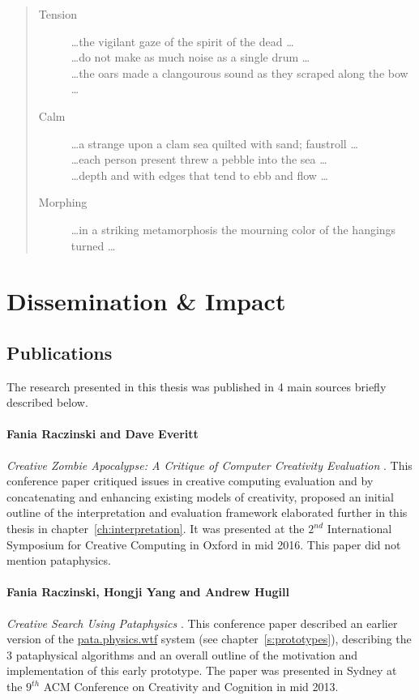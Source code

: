 \begin{quotation}
\begin{description}
  \item [Tension] \ldots the vigilant gaze of the spirit of the dead \ldots \\ \ldots do not make as much noise as a single drum \ldots \\ \ldots the oars made a clangourous sound as they scraped along the bow \ldots
  \item [Calm] \ldots a strange upon a clam sea quilted with sand; faustroll \ldots \\ \ldots each person present threw a pebble into the sea \ldots \\ \ldots depth and with edges that tend to ebb and flow \ldots 
  \item [Morphing] \ldots in a striking metamorphosis the mourning color of the hangings turned \ldots 
\end{description}
\end{quotation}


\section{Dissemination \& Impact}


\subsection{Publications}

The research presented in this thesis was published in 4 main sources briefly described below.

\paragraph{Fania Raczinski and Dave Everitt} \textit{Creative Zombie Apocalypse: A Critique of Computer Creativity Evaluation} \autocite*{Raczinski2016}. This conference paper critiqued issues in creative computing evaluation and by concatenating and enhancing existing models of creativity, proposed an initial outline of the interpretation and evaluation framework elaborated further in this thesis in chapter~\ref{ch:interpretation}. It was presented at the $2^{nd}$ International Symposium for Creative Computing in Oxford in mid 2016. This paper did not mention pataphysics.

\paragraph{Fania Raczinski, Hongji Yang and Andrew Hugill} \textit{Creative Search Using Pataphysics} \autocite*{Raczinski2013}. This conference paper described an earlier version of the \url{pata.physics.wtf} system (see chapter~\ref{s:prototypes}), describing the 3 pataphysical algorithms and an overall outline of the motivation and implementation of this early prototype. The paper was presented in Sydney at the $9^{th}$ ACM Conference on Creativity and Cognition in mid 2013.

